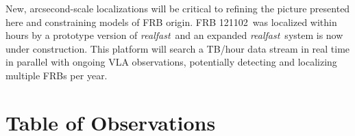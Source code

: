 \documentclass[twocolumn]{aastex61}
\newcommand{\rf}{\emph{realfast}}
\newcommand{\frb}{FRB 121102}
\begin{document}
New, arcsecond-scale localizations will be critical to refining the picture presented here and constraining models of FRB origin. \frb\ was localized within hours by a prototype version of \rf\ and an expanded \rf\ system is now under construction. This platform will search a TB/hour data stream in real time in parallel with ongoing VLA observations, potentially detecting and localizing multiple FRBs per year.

\appendix


\section{Table of Observations}

\startlongtable
\end{document}
